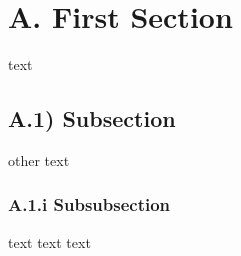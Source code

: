 \hypertarget{first-section}{%
\section{A. First Section}\label{first-section}}

text

\hypertarget{subsection}{%
\subsection{A.1) Subsection}\label{subsection}}

other text

\hypertarget{subsubsection}{%
\subsubsection{A.1.i Subsubsection}\label{subsubsection}}

text text text
